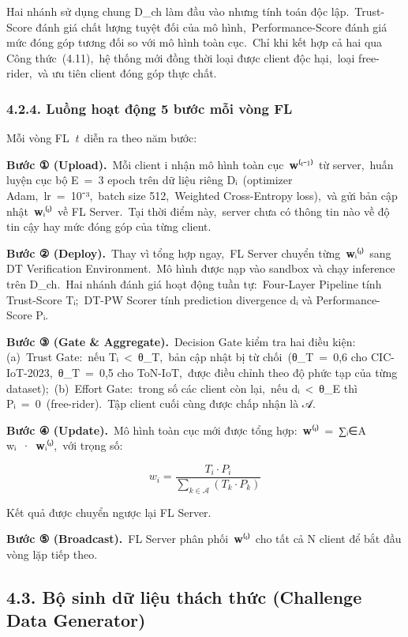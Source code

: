Hai nhánh sử dụng chung D\_ch làm đầu vào nhưng tính toán độc lập.~Trust-Score đánh giá chất lượng tuyệt đối của mô hình,~Performance-Score đánh giá mức đóng góp tương đối so với mô hình toàn cục.~Chỉ khi kết hợp cả hai qua Công thức~(4.11),~hệ thống mới đồng thời loại được client độc hại,~loại free-rider,~và ưu tiên client đóng góp thực chất.

\subsubsection{4.2.4. Luồng hoạt động 5 bước mỗi vòng FL}\label{luux1ed3ng-houx1ea1t-ux111ux1ed9ng-5-bux1b0ux1edbc-mux1ed7i-vuxf2ng-fl}

Mỗi vòng FL~\emph{t}~diễn ra theo năm bước:

\textbf{Bước ① (Upload).}~Mỗi client i nhận mô hình toàn cục~\textbf{w}⁽ᵗ⁻¹⁾~từ server,~huấn luyện cục bộ E~=~3 epoch trên dữ liệu riêng Dᵢ~(optimizer Adam,~lr~=~10⁻³,~batch size 512,~Weighted Cross-Entropy loss),~và gửi bản cập nhật~\textbf{w}ᵢ⁽ᵗ⁾~về FL Server.~Tại thời điểm này,~server chưa có thông tin nào về độ tin cậy hay mức đóng góp của từng client.

\textbf{Bước ② (Deploy).}~Thay vì tổng hợp ngay,~FL Server chuyển từng~\textbf{w}ᵢ⁽ᵗ⁾~sang DT Verification Environment.~Mô hình được nạp vào sandbox và chạy inference trên D\_ch.~Hai nhánh đánh giá hoạt động tuần tự:~Four-Layer Pipeline tính Trust-Score Tᵢ;~DT-PW Scorer tính prediction divergence dᵢ và Performance-Score Pᵢ.

\textbf{Bước ③ (Gate \& Aggregate).}~Decision Gate kiểm tra hai điều kiện: (a)~Trust Gate:~nếu Tᵢ~\textless~θ\_T,~bản cập nhật bị từ chối~(θ\_T~=~0,6 cho CIC-IoT-2023,~θ\_T~=~0,5 cho ToN-IoT,~được điều chỉnh theo độ phức tạp của từng dataset);~(b)~Effort Gate:~trong số các client còn lại,~nếu dᵢ~\textless~θ\_E thì Pᵢ~=~0~(free-rider).~Tập client cuối cùng được chấp nhận là 𝒜.

\textbf{Bước ④ (Update).}~Mô hình toàn cục mới được tổng hợp:~\textbf{w}⁽ᵗ⁾~=~∑ᵢ∈A wᵢ~·~\textbf{w}ᵢ⁽ᵗ⁾,~với trọng số:

\[w_{i} = \frac{T_{i} \cdot P_{i}}{\sum_{k \in \mathcal{A}}^{}(T_{k} \cdot P_{k})}
\]

Kết quả được chuyển ngược lại FL Server.

\textbf{Bước ⑤ (Broadcast).}~FL Server phân phối~\textbf{w}⁽ᵗ⁾~cho tất cả N client để bắt đầu vòng lặp tiếp theo.

\subsection{4.3. Bộ sinh dữ liệu thách thức (Challenge Data Generator)}\label{bux1ed9-sinh-dux1eef-liux1ec7u-thuxe1ch-thux1ee9c-challenge-data-generator}

